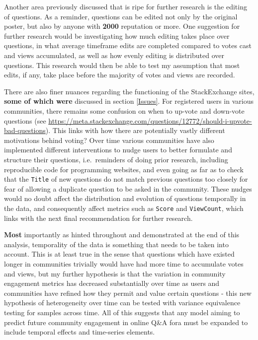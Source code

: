 \documentclass[11pt,preprint, authoryear]{article}
\numberwithin{equation}{section}
\begin{document}
Another area previously discussed that is ripe for further research is
the editing of questions. As a reminder, questions can be edited not
only by the original poster, but also by anyone with \textbf{2000}
reputation or more. One suggestion for further research would be
investigating how much editing takes place over questions, in what
average timeframe edits are completed compared to votes cast and views
accumulated, as well as how evenly editing is distributed over
questions. This research would then be able to test my assumption that
most edits, if any, take place before the majority of votes and views
are recorded.

There are also finer nuances regarding the functioning of the
StackExchange sites, \textbf{some of which were} discussed in section
\ref{Issues}. For registered users in various communities, there remains
some confusion on when to up-vote and down-vote questions (see
\url{https://meta.stackexchange.com/questions/12772/should-i-upvote-bad-questions}).
This links with how there are potentially vastly different motivations
behind voting? Over time various communities have also implemented
different interventions to nudge users to better formulate and structure
their questions, i.e.~reminders of doing prior research, including
reproducible code for programming websites, and even going as far as to
check that the \texttt{Title} of new questions do not match previous
questions too closely for fear of allowing a duplicate question to be
asked in the community. These nudges would no doubt affect the
distribution and evolution of questions temporally in the data, and
consequently affect metrics such as \texttt{Score} and
\texttt{ViewCount}, which links with the next final recommendation for
further research.

\textbf{Most} importantly as hinted throughout and demonstrated at the
end of this analysis, temporality of the data is something that needs to
be taken into account. This is at least true in the sense that questions
which have existed longer in communities trivially would have had more
time to accumulate votes and views, but my further hypothesis is that
the variation in community engagement metrics has decreased
substantially over time as users and communities have refined how they
permit and value certain questions - this new hypothesis of
heterogeneity over time can be tested with variance equivalence testing
for samples across time. All of this suggests that any model aiming to
predict future community engagement in online Q\&A fora must be expanded
to include temporal effects and time-series elements.
\end{document}
